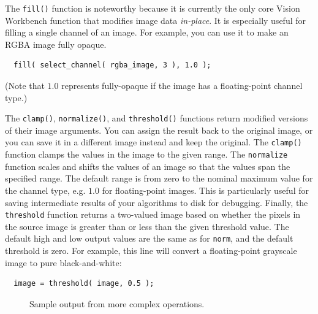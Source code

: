 The \verb#fill()# function is noteworthy because it is currently the
only core Vision Workbench function that modifies image data {\it
  in-place}.  It is especially useful for filling a single channel of
an image.  For example, you can use it to make an RGBA image fully
opaque.
\begin{verbatim}
  fill( select_channel( rgba_image, 3 ), 1.0 );
\end{verbatim}
(Note that $1.0$ represents fully-opaque if the image has a
floating-point channel type.)

The \verb#clamp()#, \verb#normalize()#, and \verb#threshold()#
functions return modified versions of their image arguments.
You can assign the result back to the original image, or you can
save it in a different image instead and keep the original.
The \verb#clamp()# function clamps the values in the image to
the given range.  The \verb#normalize# function scales and
shifts the values of an image so that the values span the
specified range.  The default range is from zero to the nominal
maximum value for the channel type, e.g. $1.0$ for floating-point
images.  This is particularly useful for saving intermediate
results of your algorithms to disk for debugging.  Finally, the
\verb#threshold# function returns a two-valued image based on
whether the pixels in the source image is greater than or less
than the given threshold value.  The default high and low output
values are the same as for \verb#norm#, and the default threshold
is zero.  For example, this line will convert a floating-point
grayscale image to pure black-and-white:
\begin{verbatim}
  image = threshold( image, 0.5 );
\end{verbatim}

\begin{figure}[hp]
\centering
  \hfill
  \hfill
  \hfill
\caption{Sample output from more complex operations.}
\label{fig:complex}
\end{figure}

